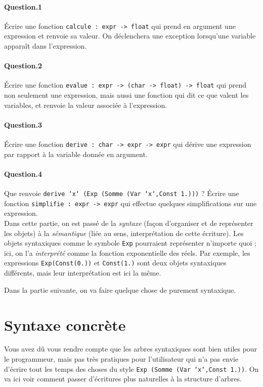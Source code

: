 \documentclass[10pt,a4paper]{article}
\theoremstyle{definition}
\begin{document}
\paragraph{Question.1} Écrire une fonction \texttt{calcule : expr -> float} qui
prend en argument une expression et renvoie sa valeur. On déclenchera une 
exception lorsqu'une variable apparaît dans l'expression.

\paragraph{Question.2} Écrire une fonction \texttt{evalue : expr -> (char -> float) -> float}
qui prend non seulement une expression, mais aussi une fonction qui dit ce que 
valent les variables, et renvoie la valeur associée à l'expression.

\paragraph{Question.3} Écrire une fonction \texttt{derive : char -> expr -> expr} qui 
dérive une expression par rapport à la variable donnée en argument.

\paragraph{Question.4} Que renvoie \texttt{derive `x` (Exp (Somme (Var `x`,Const 1.)))} ?
Écrire une fonction \texttt{simplifie : expr -> expr} qui effectue quelques
simplifications sur une expression.
\\

Dans cette partie, on est passé de la \textit{syntaxe} (façon d'organiser et de
représenter les objets) à la \textit{sémantique} (liée au sens, interprétation
de cette écriture). Les objets syntaxiques comme le symbole \texttt{Exp} 
pourraient représenter n'importe quoi ; ici, on l'a \textit{interprété} comme
la fonction exponentielle des réels. Par exemple, les expressions 
\texttt{Exp(Const(0.))} et \texttt{Const(1.)} sont deux objets syntaxiques
différents, mais leur interprétation est ici la même.

Dans la partie suivante, on va faire quelque chose de purement syntaxique.

\section{Syntaxe concrète}
Vous avez dû vous rendre compte que les arbres syntaxiques sont bien utiles
pour le programmeur, mais pas très pratiques pour l'utilisateur qui n'a pas
envie d'écrire tout les temps des choses du style \texttt{Exp (Somme (Var `x`,Const 1.))}.
On va ici voir comment passer d'écritures plus naturelles à la structure 
d'arbres.
\end{document}
